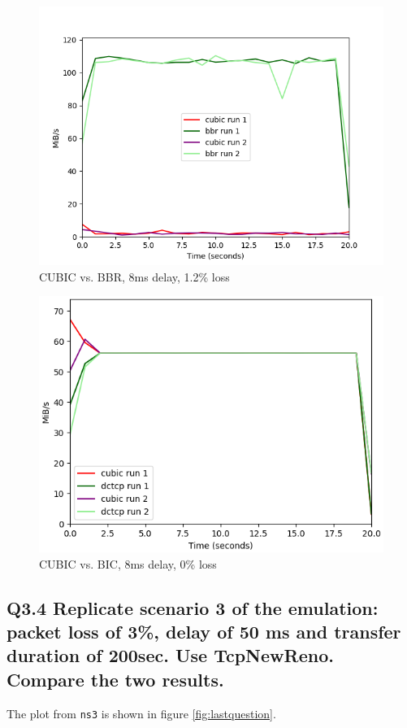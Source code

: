 \documentclass{article}
\begin{document}
\begin{figure}[H]
	\includegraphics{cubic_vs_bbr_8_12.png}
	\caption{CUBIC vs. BBR, 8ms delay, 1.2\% loss}
	\label{fig:cubic-bbr-8-12}
\end{figure}

\begin{figure}[H]
	\includegraphics[width=\textwidth]{cubic-bic-8-0.png}
	\caption{CUBIC vs. BIC, 8ms delay, 0\% loss}
	\label{fig:cubic-bic-8-0}
\end{figure}


\subsection{Q3.4 Replicate scenario 3 of the emulation: packet loss of 3\%, delay of 50 ms and transfer duration of 200sec. Use TcpNewReno. Compare the two results.}
The plot from \texttt{ns3} is shown in figure \ref{fig:lastquestion}.
\end{document}

